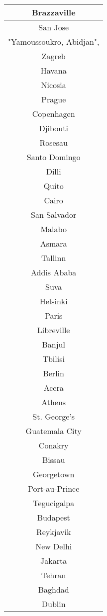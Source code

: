 \documentclass{article}
\begin{document}
\begin{center}
\begin{tabular} {|| c ||}
   Brazzaville\\ \hline 
   San Jose\\ \hline 
   "Yamoussoukro, Abidjan",\\ \hline 
   Zagreb\\ \hline 
   Havana\\ \hline 
   Nicosia\\ \hline 
   Prague\\ \hline 
   Copenhagen\\ \hline 
   Djibouti\\ \hline 
   Rosesau\\ \hline 
   Santo Domingo\\ \hline 
   Dilli\\ \hline 
   Quito\\ \hline 
   Cairo\\ \hline 
   San Salvador\\ \hline 
   Malabo\\ \hline 
   Asmara\\ \hline 
   Tallinn\\ \hline 
   Addis Ababa\\ \hline 
   Suva\\ \hline 
   Helsinki\\ \hline 
   Paris\\ \hline 
   Libreville\\ \hline 
   Banjul\\ \hline 
   Tbilisi\\ \hline 
   Berlin\\ \hline 
   Accra\\ \hline 
   Athens\\ \hline 
   St. George's\\ \hline 
   Guatemala City\\ \hline 
   Conakry\\ \hline 
   Bissau\\ \hline 
   Georgetown\\ \hline 
   Port-au-Prince\\ \hline 
   Tegucigalpa\\ \hline 
   Budapest\\ \hline 
   Reykjavik\\ \hline 
   New Delhi\\ \hline 
   Jakarta\\ \hline 
   Tehran\\ \hline 
   Baghdad\\ \hline 
   Dublin\\ \hline 

\end{tabular}
\end{center}
\end{document}
